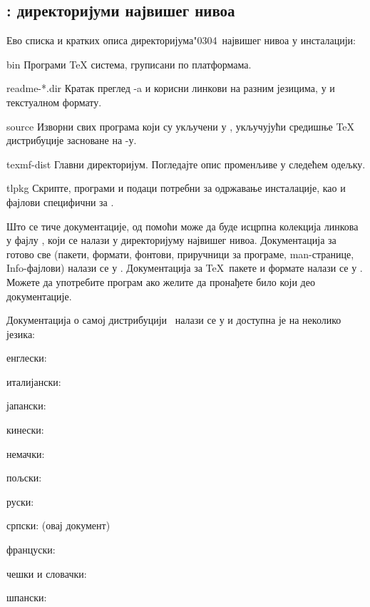 \documentclass{article}
\begin{document}
\subsection{\protect\TL{}: директоријуми највишег нивоа}
\label{sec:tld}

Ево списка и кратких описа директоријума\char"0304\ највишег нивоа у
\TL{} инсталацији:

\begin{ttdescription}
\item[bin] Програми \TeX{} система, груписани по платформама.
%
\item[readme-*.dir] Кратак преглед \TL{}-a и корисни линкови на
  разним језицима, у \HTML{} и текстуалном формату.
%
\item[source] Изворни  свих програма који су укључени у
  \TL{}, укључујући средишње \TeX{} дистрибуције засноване на
  \Webc{}-у.
%
\item[texmf-dist] Главни директоријум. Погледајте опис променљиве
   у следећем одељку.
%
\item[tlpkg] Скрипте, програми и подаци потребни за одржавање
  инсталације, као и фајлови специфични за \Windows{}.
\end{ttdescription}

Што се тиче документације, од помоћи може да буде исцрпна колекција
линкова у фајлу , који се налази у директоријуму највишег
нивоа. Документација за готово све (пакети, формати, фонтови, приручници
за програме, man-странице, Info-фајлови) налази се у .
Документација за \TeX\ пакете и формате налази се у
. Можете да употребите програм 
ако желите да пронађете било који део документације.

Документација о самој дистрибуцији \TL\ налази се у
 и доступна је на неколико језика:

\begin{itemize*}
\item{енглески:} 
\item{италијански:} 
\item{јапански:} 
\item{кинески:} 
\item{немачки:} 
\item{пољски:} 
\item{руски:} 
\item{српски:}  (овај документ)
\item{француски:} 
\item{чешки и словачки:} 
\item{шпански:} 
\end{itemize*}
\end{document}
